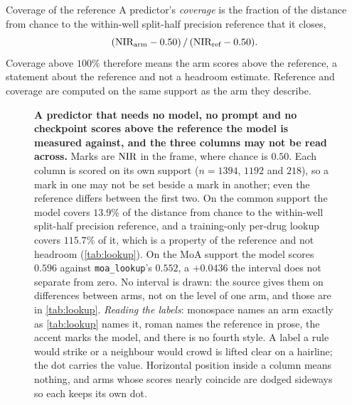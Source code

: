 \begin{defn}{Coverage of the reference}
A predictor's \emph{coverage} is the fraction of the distance from chance to the
within-well split-half precision reference that it closes,
\[
  (\textrm{NIR}_{\text{arm}} - 0.50)\,/\,(\textrm{NIR}_{\text{ref}} - 0.50).
\]
Coverage above $100\%$ therefore means the arm scores above the reference, a
statement about the reference and not a headroom estimate. Reference and coverage
are computed on the same support as the arm they describe.
\end{defn}

\begin{figure}[htbp]
\centering

\caption[The baseline ladder]{\textbf{A predictor that needs no model, no prompt
and no checkpoint scores above the reference the model is measured against, and
the three columns may not be read across.} Marks are $\textrm{NIR}$ in the \Rframe{}
frame, where chance is $0.50$. Each column is scored on its own support
($n = \num{1394}$, $\num{1192}$ and $\num{218}$), so a mark in one may not be set
beside a mark in another; even the reference differs between the first two. On
the common support the model covers $13.9\%$ of the distance from chance to the
within-well split-half precision reference, and a training-only per-drug lookup
covers $115.7\%$ of it, which is a property of the reference and not headroom
(\cref{tab:lookup}). On the MoA support the model scores $0.596$ against
\texttt{moa\_lookup}'s $0.552$, a $+0.0436$ the interval does not separate from
zero. No interval is drawn: the source gives them on differences between arms,
not on the level of one arm, and those are in \cref{tab:lookup}. \emph{Reading
the labels}: monospace names an arm exactly as \cref{tab:lookup} names it, roman
names the reference in prose, the accent marks the model, and there is no fourth
style. A label a rule would strike or a neighbour would crowd is lifted clear on
a hairline; the dot carries the value. Horizontal position inside a column means
nothing, and arms whose scores nearly coincide are dodged sideways so each keeps
its own dot.}
\label{fig:ladder}
\end{figure}

